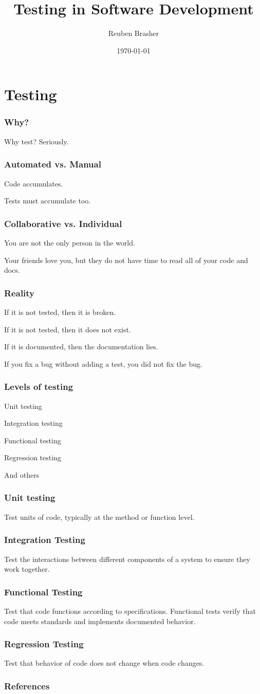 \documentclass{beamer}
\title{Testing in Software Development}
\author{Reuben Brasher}
\date{\today}
\begin{document}
\frame{\titlepage}

\section[Outline]{}
\frame{\tableofcontents}

\section{Testing}

\frame
{
   \frametitle{Why?}

    Why test? Seriously.
}

\frame
{
   \frametitle{Automated vs. Manual}

    Code accumulates.

    Tests must accumulate too.
}

\frame
{
   \frametitle{Collaborative vs. Individual}

    You are not the only person in the world.

    Your friends love you, but they do not have time to read all of your code and docs.
}

\frame
{
   \frametitle{Reality}

    If it is not tested, then it is broken.

    If it is not tested, then it does not exist.

    If it is documented, then the documentation lies.

    If you fix a bug without adding a test, you did not fix the bug.
}


\frame
{
   \frametitle{Levels of testing}

    Unit testing

    Integration testing

    Functional testing

    Regression testing

    And others
}

\frame
{
   \frametitle{Unit testing}

    Test units of code, typically at the method or function level.
}


\frame
{
   \frametitle{Integration Testing}

    Test the interactions between different components of a system to ensure they work together.
}

\frame
{
   \frametitle{Functional Testing}

    Test that code functions according to specifications. Functional tests verify that code meets standards and
    implements documented behavior.
}

\frame
{
   \frametitle{Regression Testing}

    Test that behavior of code does not change when code changes.
}



\begin{frame}[t,allowframebreaks]
\frametitle{References}
\printbibliography
\end{frame}
\end{document}
